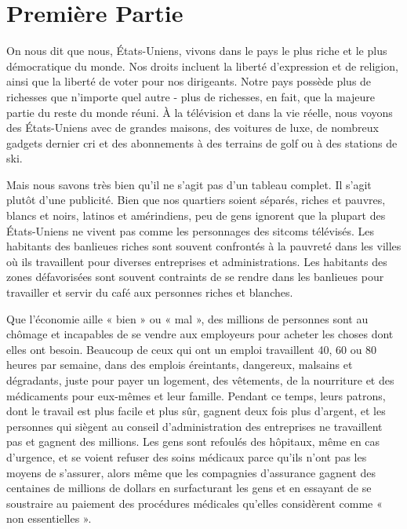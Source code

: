 \chapter*{\textbf{Première Partie}}

On nous dit que nous, États-Uniens, vivons dans le pays le plus riche et le plus démocratique du monde. Nos droits incluent la liberté d'expression et de religion, ainsi que la liberté de voter pour nos dirigeants. Notre pays possède plus de richesses que n'importe quel autre - plus de richesses, en fait, que la majeure partie du reste du monde réuni. À la télévision et dans la vie réelle, nous voyons des États-Uniens avec de grandes maisons, des voitures de luxe, de nombreux gadgets dernier cri et des abonnements à des terrains de golf ou à des stations de ski.

Mais nous savons très bien qu'il ne s'agit pas d'un tableau complet. Il s'agit plutôt d'une publicité. Bien que nos quartiers soient séparés, riches et pauvres, blancs et noirs, latinos et amérindiens, peu de gens ignorent que la plupart des États-Uniens ne vivent pas comme les personnages des sitcoms télévisés. Les habitants des banlieues riches sont souvent confrontés à la pauvreté dans les villes où ils travaillent pour diverses entreprises et administrations. Les habitants des zones défavorisées sont souvent contraints de se rendre dans les banlieues pour travailler et servir du café aux personnes riches et blanches.

Que l'économie aille « bien » ou « mal », des millions de personnes sont au chômage et incapables de se vendre aux employeurs pour acheter les choses dont elles ont besoin. Beaucoup de ceux qui ont un emploi travaillent 40, 60 ou 80 heures par semaine, dans des emplois éreintants, dangereux, malsains et dégradants, juste pour payer un logement, des vêtements, de la nourriture et des médicaments pour eux-mêmes et leur famille. Pendant ce temps, leurs patrons, dont le travail est plus facile et plus sûr, gagnent deux fois plus d'argent, et les personnes qui siègent au conseil d'administration des entreprises ne travaillent pas et gagnent des millions. Les gens sont refoulés des hôpitaux, même en cas d'urgence, et se voient refuser des soins médicaux parce qu'ils n'ont pas les moyens de s'assurer, alors même que les compagnies d'assurance gagnent des centaines de millions de dollars en surfacturant les gens et en essayant de se soustraire au paiement des procédures médicales qu'elles considèrent comme « non essentielles ».

